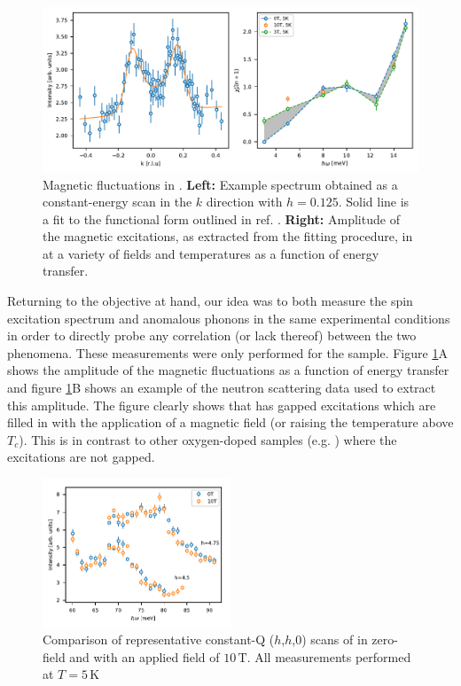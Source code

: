 \begin{figure}
    \centering
    \includegraphics[width=\textwidth]{fig/anomaly/chi.pdf}
    \caption{Magnetic fluctuations in \LSCOOsix{}. \textbf{Left:} Example spectrum obtained as a constant-energy scan in the $k$ direction with $h=0.125$. Solid line is a fit to the functional form outlined in ref. \cite{Aeppli1997}. \textbf{Right:} Amplitude of the magnetic excitations, as extracted from the fitting procedure, in at a variety of fields and temperatures as a function of energy transfer.}
    \label{fig:lscoo_chi}
\end{figure}

Returning to the objective at hand, our idea was to both measure the spin excitation spectrum and anomalous phonons in the same experimental conditions in order to directly probe any correlation (or lack thereof) between the two phenomena. These measurements were only performed for the \LSCOOsix{} sample. Figure \ref{fig:lscoo_chi}A shows the amplitude of the magnetic fluctuations as a function of energy transfer and figure \ref{fig:lscoo_chi}B shows an example of the neutron scattering data used to extract this amplitude. The figure clearly shows that \LSCOOsix{} has gapped excitations which are filled in with the application of a magnetic field (or raising the temperature above $T_c$). This is in contrast to other oxygen-doped samples (e.g. \LCOO{} \cite{Jacobsen2018}) where the excitations are not gapped.

\begin{figure}
    \centering
    \includegraphics[width=0.5\textwidth]{fig/anomaly/fig4.pdf}
    \caption{Comparison of representative constant-Q ($h$,$h$,0) scans of \LSCOOsix{} in zero-field and with an applied field of $10\,\text{T}$. All measurements performed at $T=5\,\text{K}$}
    \label{fig:in8_lscoo_field}
\end{figure}

